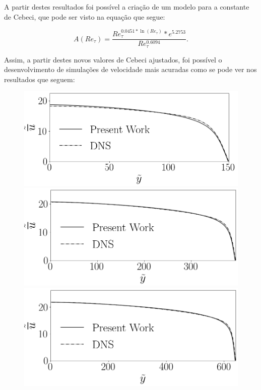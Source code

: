 A partir destes resultados foi possível a criação de um modelo para a constante de Cebeci, que pode ser visto na equação que segue:

\begin{equation}\label{Amodelado}
A \left( Re_\tau\right)= \frac{Re_\tau ^{0.0451 * \ln(Re_\tau)} *e ^ {5.2753} }{Re_\tau ^{0.6094}}.
\end{equation}

Assim, a partir destes novos valores de Cebeci ajustados, foi possível o desenvolvimento de simulações de velocidade mais acuradas como se pode ver nos resultados que seguem:

\begin{figure}[!h]
	\centering
	\begin{minipage}[t]{0.5\textwidth}
		\centering
		\includegraphics[angle=0, scale=0.34]{fotos_formatacao_final/Temperature_150_Amodeled}
	\end{minipage}
	\begin{minipage}[t]{0.45\textwidth}
		\centering
		\includegraphics[angle=0, scale=0.34]{fotos_formatacao_final/Temperature_395_Amodeled}
	\end{minipage}
	\begin{minipage}[t]{0.5\textwidth}
		\centering
		\includegraphics[angle=0, scale=0.34]{fotos_formatacao_final/Temperature_640_Amodeled}

\end{minipage}
\end{figure}
